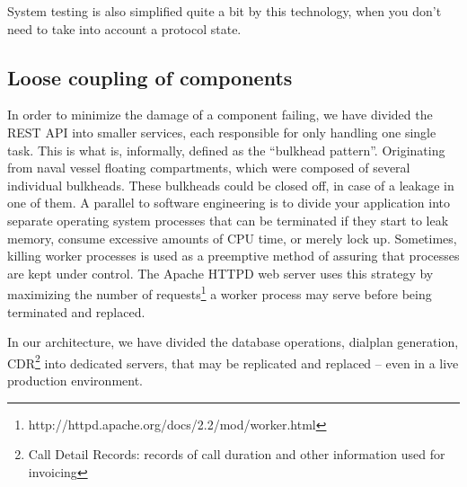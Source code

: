 \noindent System testing is also simplified quite a bit by this technology, when you don't need to take into account a protocol state.

\subsection{Loose coupling of components} 
In order to minimize the damage of a component failing, we have divided the REST API into smaller services, each responsible for only handling one single task. This is what is, informally, defined as the ``bulkhead pattern''. Originating from naval vessel floating compartments, which were composed of several individual bulkheads. These bulkheads could be closed off, in case of a leakage in one of them. A parallel to software engineering is to divide your application into separate operating system processes that can be terminated if they start to leak memory, consume excessive amounts of CPU time, or merely lock up. Sometimes, killing worker processes is used as a preemptive method of assuring that processes are kept under control. The Apache HTTPD web server uses this strategy by maximizing the number of requests\footnote{http://httpd.apache.org/docs/2.2/mod/worker.html} a worker process may serve before being terminated and replaced.\smallskip

\noindent In our architecture, we have divided the database operations, dialplan generation, CDR\footnote{Call Detail Records: records of call duration and other information used for invoicing} into dedicated servers, that may be replicated and replaced -- even in a live production environment.

